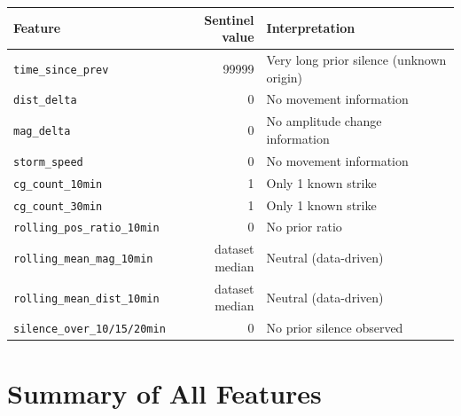 \documentclass[12pt,a4paper]{article}
\begin{document}
\begin{center}
\begin{tabular}{lrl}
\toprule
\textbf{Feature} & \textbf{Sentinel value} & \textbf{Interpretation} \\
\midrule
\texttt{time\_since\_prev} & 99999 & Very long prior silence (unknown origin) \\
\texttt{dist\_delta}       & 0 & No movement information \\
\texttt{mag\_delta}        & 0 & No amplitude change information \\
\texttt{storm\_speed}      & 0 & No movement information \\
\texttt{cg\_count\_10min}  & 1 & Only 1 known strike \\
\texttt{cg\_count\_30min}  & 1 & Only 1 known strike \\
\texttt{rolling\_pos\_ratio\_10min} & 0 & No prior ratio \\
\texttt{rolling\_mean\_mag\_10min}  & dataset median & Neutral (data-driven) \\
\texttt{rolling\_mean\_dist\_10min} & dataset median & Neutral (data-driven) \\
\texttt{silence\_over\_10/15/20min} & 0 & No prior silence observed \\
\bottomrule
\end{tabular}
\end{center}

\vspace{1em}

\section{Summary of All Features}
\end{document}
